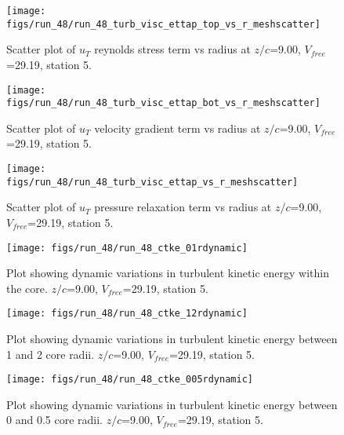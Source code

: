 \begin{figure}[H]
\centering
\texttt{[image: figs/run\_48/run\_48\_turb\_visc\_ettap\_top\_vs\_r\_meshscatter]}
\caption{Scatter plot of $
u_T$ reynolds stress term vs radius at $z/c$=9.00, $V_{free}$=29.19, station 5.}
\label{fig:run_48_turb_visc_ettap_top_vs_r_meshscatter}
\end{figure}


\begin{figure}[H]
\centering
\texttt{[image: figs/run\_48/run\_48\_turb\_visc\_ettap\_bot\_vs\_r\_meshscatter]}
\caption{Scatter plot of $
u_T$ velocity gradient term vs radius at $z/c$=9.00, $V_{free}$=29.19, station 5.}
\label{fig:run_48_turb_visc_ettap_bot_vs_r_meshscatter}
\end{figure}


\begin{figure}[H]
\centering
\texttt{[image: figs/run\_48/run\_48\_turb\_visc\_ettap\_vs\_r\_meshscatter]}
\caption{Scatter plot of $
u_T$ pressure relaxation term vs radius at $z/c$=9.00, $V_{free}$=29.19, station 5.}
\label{fig:run_48_turb_visc_ettap_vs_r_meshscatter}
\end{figure}


\begin{figure}[H]
\centering
\texttt{[image: figs/run\_48/run\_48\_ctke\_01rdynamic]}
\caption{Plot showing dynamic variations in turbulent kinetic energy within the core. $z/c$=9.00, $V_{free}$=29.19, station 5.}
\label{fig:run_48_ctke_01rdynamic}
\end{figure}


\begin{figure}[H]
\centering
\texttt{[image: figs/run\_48/run\_48\_ctke\_12rdynamic]}
\caption{Plot showing dynamic variations in turbulent kinetic energy between 1 and 2 core radii. $z/c$=9.00, $V_{free}$=29.19, station 5.}
\label{fig:run_48_ctke_12rdynamic}
\end{figure}


\begin{figure}[H]
\centering
\texttt{[image: figs/run\_48/run\_48\_ctke\_005rdynamic]}
\caption{Plot showing dynamic variations in turbulent kinetic energy between 0 and 0.5 core radii. $z/c$=9.00, $V_{free}$=29.19, station 5.}
\label{fig:run_48_ctke_005rdynamic}
\end{figure}


